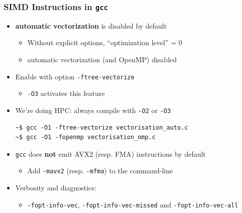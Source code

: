 \documentclass[xcolor={x11names,svgnames}]{beamer}
\begin{document}
\begin{frame}[fragile=singleslide]
  \frametitle{SIMD Instructions in \texttt{gcc}}

    \begin{itemize}
    \item \textbf{automatic vectorization} is \alert{disabled} by default 
      \begin{itemize}
      \item Without explicit options, ``optimization level'' = 0
      \item automatic vectorization (and OpenMP) disabled
      \end{itemize}

      \medskip
      
    \item Enable with option \verb|-ftree-vectorize|
      \begin{itemize}
      \item \verb|-O3| activates this feature
      \end{itemize}
    \item We're doing HPC: always compile with \verb|-O2| or \verb|-O3|
  \begin{verbatim}
~$ gcc -O1 -ftree-vectorize vectorisation_auto.c
~$ gcc -O1 -fopenmp vectorisation_omp.c
\end{verbatim}

\medskip
  
  \item \texttt{gcc} does \textbf{not} emit AVX2 (resp. FMA) instructions by default
    \begin{itemize}
    \item Add \verb|-mavx2| (resp. \verb|-mfma|) to the command-line
    \end{itemize}

\medskip

\item Verbosity and diagnostics:
  \begin{itemize}
  \item \scriptsize \verb|-fopt-info-vec|, \verb|-fopt-info-vec-missed| and \verb|-fopt-info-vec-all|
  \end{itemize}
  \end{itemize}

  

\end{frame}
\end{document}
